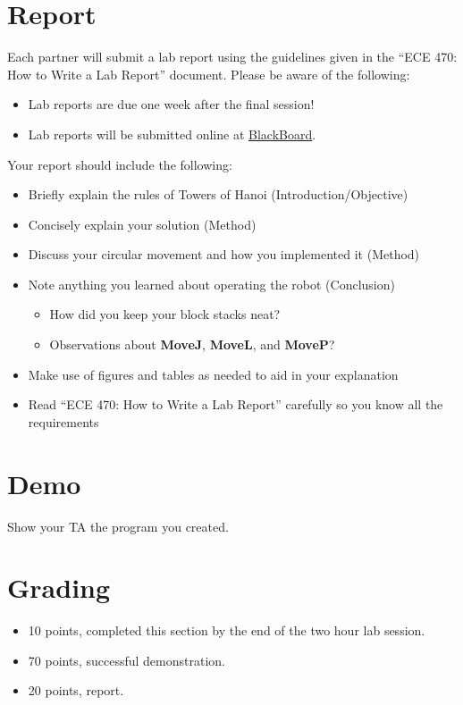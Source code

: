 \section{Report}
Each partner will submit a lab report using the guidelines given in the “ECE 470: How to Write a Lab Report” document.  Please be aware of the following:
\begin{itemize}
	\item Lab reports are due one week after the final session!
	\item Lab reports will be submitted online at \href{https://learn.intl.zju.edu.cn/webapps/login/}{BlackBoard}.
\end{itemize}
Your report should include the following:
\begin{itemize}
	\item Briefly explain the rules of Towers of Hanoi (Introduction/Objective)
	\item Concisely explain your solution (Method)
	\item Discuss your circular movement and how you implemented it (Method)
	\item Note anything you learned about operating the robot (Conclusion)
	\begin{itemize}
		\item How did you keep your block stacks neat?
		\item Observations about \textbf{MoveJ}, \textbf{MoveL}, and \textbf{MoveP}?
	\end{itemize}
	\item Make use of figures and tables as needed to aid in your explanation
	\item Read “ECE 470: How to Write a Lab Report” carefully so you know all the requirements
	  
\end{itemize}

\section{Demo}
Show your TA the program you created.  

\section{Grading}
\begin{itemize}
\item 10 points, completed this section by the end of the two hour lab session.  
\item 70 points, successful demonstration.
\item 20 points, report.
\end{itemize}


